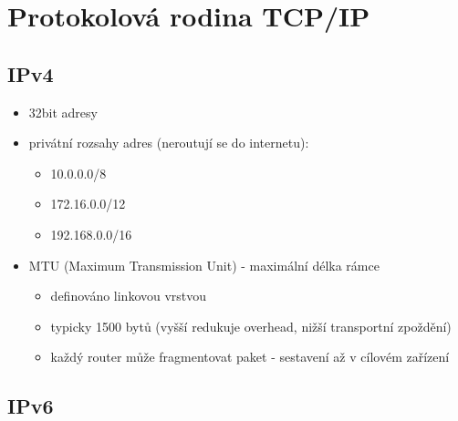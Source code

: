 \documentclass{szzclass}
\providecommand{\tightlist}{%
  \setlength{\itemsep}{0pt}\setlength{\parskip}{0pt}}
\begin{document}


\hypertarget{protokolovuxe1-rodina-tcpip}{%
\section{Protokolová rodina
TCP/IP}\label{protokolovuxe1-rodina-tcpip}}

\hypertarget{ipv4}{%
\subsection{IPv4}\label{ipv4}}

\begin{itemize}
\tightlist
\item
  32bit adresy
\item
  privátní rozsahy adres (neroutují se do internetu):

  \begin{itemize}
  \tightlist
  \item
    10.0.0.0/8
  \item
    172.16.0.0/12
  \item
    192.168.0.0/16
  \end{itemize}
\item
  MTU (Maximum Transmission Unit) - maximální délka rámce

  \begin{itemize}
  \tightlist
  \item
    definováno linkovou vrstvou
  \item
    typicky 1500 bytů (vyšší redukuje overhead, nižší transportní
    zpoždění)
  \item
    každý router může fragmentovat paket - sestavení až v cílovém
    zařízení
  \end{itemize}
\end{itemize}

\hypertarget{ipv6}{%
\subsection{IPv6}\label{ipv6}}
\end{document}
